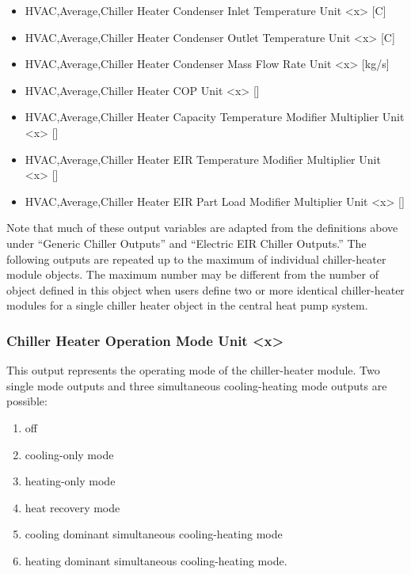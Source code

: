 \begin{itemize}
    \item
    HVAC,Average,Chiller Heater Condenser Inlet Temperature Unit \textless{}x\textgreater{} {[}C{]}
    \item
    HVAC,Average,Chiller Heater Condenser Outlet Temperature Unit \textless{}x\textgreater{} {[}C{]}
    \item
    HVAC,Average,Chiller Heater Condenser Mass Flow Rate Unit \textless{}x\textgreater{} {[}kg/s{]}
    \item
    HVAC,Average,Chiller Heater COP Unit \textless{}x\textgreater{} {[]}
    \item
    HVAC,Average,Chiller Heater Capacity Temperature Modifier Multiplier Unit \textless{}x\textgreater{} {[]}
    \item
    HVAC,Average,Chiller Heater EIR Temperature Modifier Multiplier Unit \textless{}x\textgreater{} {[]}
    \item
    HVAC,Average,Chiller Heater EIR Part Load Modifier Multiplier Unit \textless{}x\textgreater{} {[]}
\end{itemize}

Note that much of these output variables are adapted from the definitions above under ``Generic Chiller Outputs'' and ``Electric EIR Chiller Outputs.'' The following outputs are repeated up to the maximum of individual chiller-heater module objects. The maximum number may be different from the number of object defined in this object when users define two or more identical chiller-heater modules for a single chiller heater object in the central heat pump system.

\subsubsection{Chiller Heater Operation Mode Unit \textless{}x\textgreater{}}\label{chiller-heater-operation-mode-unit-x}

This output represents the operating mode of the chiller-heater module. Two single mode outputs and three simultaneous cooling-heating mode outputs are possible:

\begin{enumerate}
    \def\labelenumi{\arabic{enumi}.}
    \setcounter{enumi}{-1}
    \item
    off
    \item
    cooling-only mode
    \item
    heating-only mode
    \item
    heat recovery mode
    \item
    cooling dominant simultaneous cooling-heating mode
    \item
    heating dominant simultaneous cooling-heating mode.
\end{enumerate}


